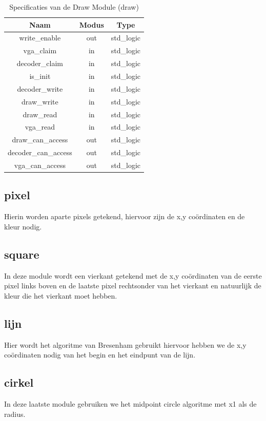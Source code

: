 \documentclass{scrreprt} %
\begin{document}
\begin{table}[H]
\centering
\caption{Specificaties van de Draw Module (draw)}
\label{tab:spec-draw}
\begin{tabular}{c c c}
	\hline\hline
 	Naam & Modus & Type\\
 	\hline	
	write\_enable & out & std\_logic\\
	vga\_claim & in & std\_logic\\
	decoder\_claim & in & std\_logic\\
	is\_init & in & std\_logic\\
	decoder\_write & in & std\_logic\\
	draw\_write & in & std\_logic\\
	draw\_read & in & std\_logic\\
	vga\_read & in & std\_logic\\
	draw\_can\_access & out & std\_logic\\
	decoder\_can\_access & out & std\_logic\\
	vga\_can\_access & out & std\_logic\\
  	\hline
\end{tabular}
\end{table}

\subsection { pixel}
Hierin worden aparte pixels getekend, hiervoor zijn de x,y coördinaten en de kleur nodig.

\subsection { square}
In deze module wordt een vierkant getekend met de x,y coördinaten van de eerste pixel links boven en de laatste pixel rechtsonder van het vierkant en natuurlijk de kleur die het vierkant moet hebben.

\subsection { lijn}
Hier wordt het algoritme van Bresenham gebruikt hiervoor hebben we de x,y coördinaten nodig van het begin en het eindpunt van de lijn.

\subsection { cirkel}
In deze laatste module gebruiken we het midpoint circle algoritme met x1 als de radius.
\end{document}

